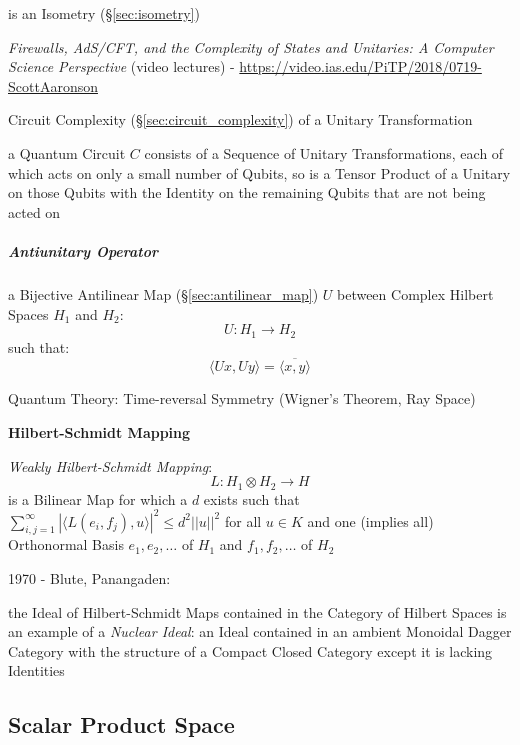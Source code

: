 is an Isometry (\S\ref{sec:isometry})

\emph{Firewalls, AdS/CFT, and the Complexity of States and Unitaries: A Computer
  Science Perspective}
(video lectures)
-
\url{https://video.ias.edu/PiTP/2018/0719-ScottAaronson}

Circuit Complexity (\S\ref{sec:circuit_complexity}) of a
Unitary Transformation

a Quantum Circuit $C$ consists of a Sequence of Unitary Transformations, each of
which acts on only a small number of Qubits, so is a Tensor Product of a Unitary
on those Qubits with the Identity on the remaining Qubits that are not being
acted on



\subparagraph{Antiunitary Operator}\label{sec:antiunitary_operator}\hfill

a Bijective Antilinear Map (\S\ref{sec:antilinear_map}) $U$ between Complex
Hilbert Spaces $H_1$ and $H_2$:
\[
  U : H_1 \rightarrow H_2
\]
such that:
\[
  \langle{Ux,Uy}\rangle = \overline{\langle{x,y}\rangle}
\]

Quantum Theory: Time-reversal Symmetry (Wigner's Theorem, Ray Space) %



\textbf{Hilbert-Schmidt Mapping}

\emph{Weakly Hilbert-Schmidt Mapping}:
\[
  L : H_1 \otimes H_2 \rightarrow H
\]
is a Bilinear Map for which a $d$ exists such that
$\sum_{i,j=1}^\infty | \langle L(e_i,f_j), u \rangle |^2 \leq d^2
||u||^2$ for all $u \in K$ and one (implies all) Orthonormal Basis
$e_1, e_2, \ldots$ of $H_1$ and $f_1, f_2, \ldots$ of $H_2$


1970 - Blute, Panangaden:

the Ideal of Hilbert-Schmidt Maps contained in the Category of Hilbert
Spaces is an example of a \emph{Nuclear Ideal}: an Ideal contained in
an ambient Monoidal Dagger Category with the structure of a Compact
Closed Category except it is lacking Identities



\subsection{Scalar Product Space}\label{sec:scalar_product_space}

